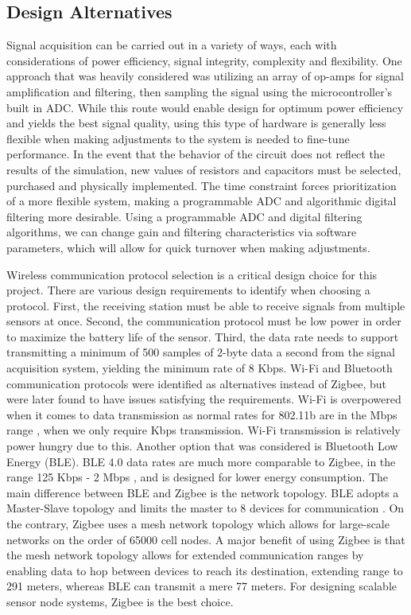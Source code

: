 \documentclass{article}
\begin{document}
\subsection{Design Alternatives}
Signal acquisition can be carried out in a variety of ways, each with considerations of power efficiency, signal integrity, complexity and flexibility. One approach that was heavily considered was utilizing an array of op-amps for signal amplification and filtering, then sampling the signal using the microcontroller's built in ADC. While this route would enable design for optimum power efficiency and yields the best signal quality, using this type of hardware is generally less flexible when making adjustments to the system is needed to fine-tune performance. In the event that the behavior of the circuit does not reflect the results of the simulation, new values of resistors and capacitors must be selected, purchased and physically implemented. The time constraint forces prioritization of a more flexible system, making a programmable ADC and algorithmic digital filtering more desirable.  Using a programmable ADC and digital filtering algorithms, we can change gain and filtering characteristics via software parameters, which will allow for quick turnover when making adjustments. \par

Wireless communication protocol selection is a critical design choice for this project. There are various design requirements to identify when choosing a protocol. First, the receiving station must be able to receive signals from multiple sensors at once. Second, the communication protocol must be low power in order to maximize the battery life of the sensor. Third, the data rate needs to support transmitting a minimum of 500 samples of 2-byte data a second from the signal acquisition system, yielding the minimum rate of 8 Kbps. Wi-Fi and Bluetooth communication protocols were identified as alternatives instead of Zigbee, but were later found to have issues satisfying the requirements. Wi-Fi is overpowered when it comes to data transmission as normal rates for 802.11b are in the Mbps range \cite{cisco}, when we only require Kbps transmission. Wi-Fi transmission is relatively power hungry due to this. Another option that was considered is Bluetooth Low Energy (BLE). BLE 4.0 data rates are much more comparable to Zigbee, in the range 125 Kbps - 2 Mbps \cite{nordic}, and is designed for lower energy consumption. The main difference between BLE and Zigbee is the network topology. BLE adopts a Master-Slave topology and limits the master to 8 devices for communication \cite{ehub}. On the contrary, Zigbee uses a mesh network topology which allows for large-scale networks on the order of 65000 cell nodes. A major benefit of using Zigbee is that the mesh network topology allows for extended communication ranges by enabling data to hop between devices to reach its destination, extending range to 291 meters, whereas BLE can transmit a mere 77 meters. For designing scalable sensor node systems, Zigbee is the best choice. 
\end{document}
